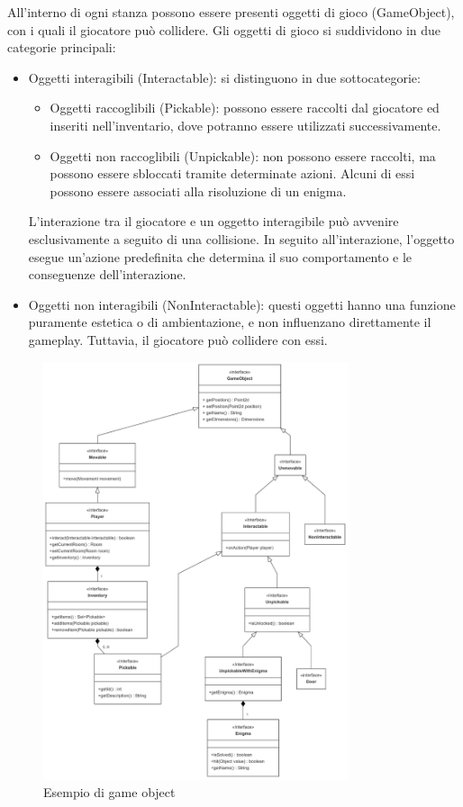 \documentclass[a4paper,12pt]{report}
\begin{document}
All'interno di ogni stanza possono essere presenti oggetti di gioco (GameObject), con i quali il giocatore può collidere. 
Gli oggetti di gioco si suddividono in due categorie principali:
\begin{itemize}
	\item Oggetti interagibili (Interactable): si distinguono in due sottocategorie:
	\begin{itemize}
		\item Oggetti raccoglibili (Pickable): possono essere raccolti dal giocatore ed inseriti nell’inventario, dove potranno essere utilizzati successivamente.
		\item Oggetti non raccoglibili (Unpickable): non possono essere raccolti, ma possono essere sbloccati tramite determinate azioni. Alcuni di essi possono essere associati alla risoluzione di un enigma.
	\end{itemize}
	L'interazione tra il giocatore e un oggetto interagibile può avvenire esclusivamente a seguito di una collisione. In seguito all'interazione, l'oggetto esegue un'azione predefinita che determina il suo comportamento e le conseguenze dell'interazione.
	\item Oggetti non interagibili (NonInteractable): questi oggetti hanno una funzione puramente estetica o di ambientazione, e non influenzano direttamente il gameplay. Tuttavia, il giocatore può collidere con essi.
\end{itemize}

\begin{figure}[h]  %
    \centering
    \includegraphics[width=0.8\textwidth]{img/gameObject.png}  %
    \caption{Esempio di game object}
    \label{img:gameObject}
\end{figure}
\end{document}
